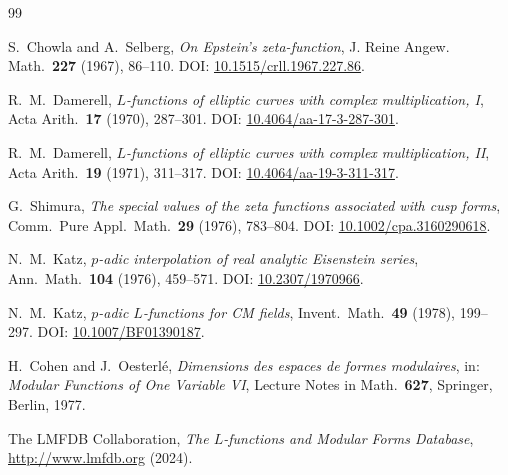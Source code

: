 \documentclass[10pt]{article}
\theoremstyle{definition}
\begin{document}
\begin{thebibliography}{99}

S.~Chowla and A.~Selberg,
\textit{On Epstein's zeta-function},
J. Reine Angew. Math.\ \textbf{227} (1967), 86--110.
DOI: \href{https://doi.org/10.1515/crll.1967.227.86}{10.1515/crll.1967.227.86}.

R.~M.~Damerell,
\textit{$L$-functions of elliptic curves with complex multiplication, {I}},
Acta Arith.\ \textbf{17} (1970), 287--301.
DOI: \href{https://doi.org/10.4064/aa-17-3-287-301}{10.4064/aa-17-3-287-301}.

R.~M.~Damerell,
\textit{$L$-functions of elliptic curves with complex multiplication, {II}},
Acta Arith.\ \textbf{19} (1971), 311--317.
DOI: \href{https://doi.org/10.4064/aa-19-3-311-317}{10.4064/aa-19-3-311-317}.

G.~Shimura,
\textit{The special values of the zeta functions associated with cusp forms},
Comm.\ Pure Appl.\ Math.\ \textbf{29} (1976), 783--804.
DOI: \href{https://doi.org/10.1002/cpa.3160290618}{10.1002/cpa.3160290618}.

N.~M.~Katz,
\textit{$p$-adic interpolation of real analytic Eisenstein series},
Ann.\ Math.\ \textbf{104} (1976), 459--571.
DOI: \href{https://doi.org/10.2307/1970966}{10.2307/1970966}.

N.~M.~Katz,
\textit{$p$-adic $L$-functions for {CM} fields},
Invent.\ Math.\ \textbf{49} (1978), 199--297.
DOI: \href{https://doi.org/10.1007/BF01390187}{10.1007/BF01390187}.

H.~Cohen and J.~Oesterlé,
\textit{Dimensions des espaces de formes modulaires},
in: \textit{Modular Functions of One Variable VI},
Lecture Notes in Math.\ \textbf{627}, Springer, Berlin, 1977.

The LMFDB Collaboration,
\textit{The $L$-functions and Modular Forms Database},
\url{http://www.lmfdb.org} (2024).


\end{thebibliography}
\end{document}
